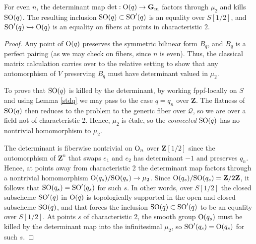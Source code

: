 \documentclass[10pt]{article}
\newcommand{\Q}{\mathscr{Q}}
\renewcommand{\(}{\left(}
\renewcommand{\)}{\right)}
\numberwithin{thm}{subsection}
\begin{document}
\begin{cor}\label{deteven}
For even $n$, the determinant map $\det: {\rm{O}}(q) \rightarrow {\mathbf{G}}_{\rm{m}}$
factors through $\mu_2$ and kills ${\rm{SO}}(q)$.
The resulting inclusion ${\rm{SO}}(q) \subset {\rm{SO}}'(q)$
is an equality over $S[1/2]$,
and ${\rm{SO}}'(q) \hookrightarrow {\rm{O}}(q)$
is an equality on fibers at points in characteristic $2$.
\end{cor}

\begin{proof}
Any point of ${\rm{O}}(q)$ preserves the symmetric bilinear form $B_q$,
and $B_q$ is a perfect pairing (as we may check on fibers, since $n$ is even).
Thus, the classical matrix calculation  carries over to the relative setting
to show that any automorphism of $V$ preserving $B_q$ must have
determinant valued in $\mu_2$.

To prove that ${\rm{SO}}(q)$ is killed by the determinant, by working fppf-locally
on $S$ and using Lemma \ref{stdq} we may pass to the case $q = q_n$
over ${\mathbf{Z}}$.  The flatness of ${\rm{SO}}(q)$ then reduces
to the problem to the generic fiber over $\Q$, so
we are over a field not of characteristic 2.  Hence, $\mu_2$ is \'etale, so
the {\em connected} ${\rm{SO}}(q)$ has no nontrivial homomorphism
to $\mu_2$.  

The determinant
is fiberwise nontrivial on ${\rm{O}}_n$ over ${\mathbf{Z}}[1/2]$
since the automorphism of ${\mathbf{Z}}^n$ that swaps $e_1$ and $e_2$
has determinant $-1$ and preserves $q_n$.  Hence,
at points away from characteristic 2 the 
determinant map factors through a nontrivial homomorphism
${\rm{O}}(q_s)/{\rm{SO}}(q_s) \rightarrow \mu_2$.
Since ${\rm{O}}(q_s)/{\rm{SO}}(q_s) = {\mathbf{Z}}/2{\mathbf{Z}}$, it follows
that ${\rm{SO}}(q_s) = {\rm{SO}}'(q_s)$ for such $s$.
In other words, over $S[1/2]$ the closed subscheme ${\rm{SO}}'(q)$
in ${\rm{O}}(q)$ is topologically supported
in the open and closed subscheme ${\rm{SO}}(q)$, 
and that forces the inclusion ${\rm{SO}}(q) \subset {\rm{SO}}'(q)$
to be an equality over $S[1/2]$.
At points $s$ of characteristic 2, the smooth
group ${\rm{O}}(q_s)$ must be killed by
the determinant map into the infinitesimal $\mu_2$,
so ${\rm{SO}}'(q_s) = {\rm{O}}(q_s)$ for such $s$. 
\end{proof}
\end{document}
